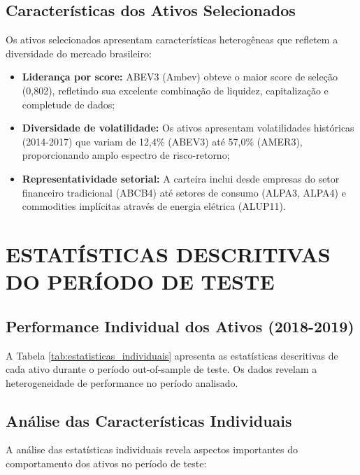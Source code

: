 \subsection{Características dos Ativos Selecionados}

Os ativos selecionados apresentam características heterogêneas que refletem a diversidade do mercado brasileiro:

\begin{itemize}
    \item \textbf{Liderança por score:} ABEV3 (Ambev) obteve o maior score de seleção (0,802), refletindo sua excelente combinação de liquidez, capitalização e completude de dados;
    
    \item \textbf{Diversidade de volatilidade:} Os ativos apresentam volatilidades históricas (2014-2017) que variam de 12,4\% (ABEV3) até 57,0\% (AMER3), proporcionando amplo espectro de risco-retorno;
    
    \item \textbf{Representatividade setorial:} A carteira inclui desde empresas do setor financeiro tradicional (ABCB4) até setores de consumo (ALPA3, ALPA4) e commodities implícitas através de energia elétrica (ALUP11).
\end{itemize}

\section{ESTATÍSTICAS DESCRITIVAS DO PERÍODO DE TESTE}

\subsection{Performance Individual dos Ativos (2018-2019)}

A Tabela \ref{tab:estatisticas_individuais} apresenta as estatísticas descritivas de cada ativo durante o período out-of-sample de teste. Os dados revelam a heterogeneidade de performance no período analisado.

% 

\subsection{Análise das Características Individuais}

A análise das estatísticas individuais revela aspectos importantes do comportamento dos ativos no período de teste:

